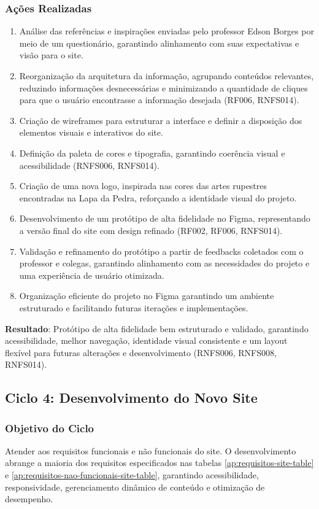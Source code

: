 \subsubsection*{Ações Realizadas}
\begin{enumerate}
    \item Análise das referências e inspirações enviadas pelo professor Edson Borges por meio de um questionário, garantindo alinhamento com suas expectativas e visão para o site.
    \item Reorganização da arquitetura da informação, agrupando conteúdos relevantes, reduzindo informações desnecessárias e minimizando a quantidade de cliques para que o usuário encontrasse a informação desejada (RF006, RNFS014).
    \item Criação de wireframes para estruturar a interface e definir a disposição dos elementos visuais e interativos do site.
    \item Definição da paleta de cores e tipografia, garantindo coerência visual e acessibilidade (RNFS006, RNFS014).
    \item Criação de uma nova logo, inspirada nas cores das artes rupestres encontradas na Lapa da Pedra, reforçando a identidade visual do projeto.
    \item Desenvolvimento de um protótipo de alta fidelidade no Figma, representando a versão final do site com design refinado (RF002, RF006, RNFS014).
    \item Validação e refinamento do protótipo a partir de feedbacks coletados com o professor e colegas, garantindo alinhamento com as necessidades do projeto e uma experiência de usuário otimizada.
    \item Organização eficiente do projeto no Figma garantindo um ambiente estruturado e facilitando futuras iterações e implementações.
\end{enumerate}

\textbf{Resultado}: Protótipo de alta fidelidade bem estruturado e validado, garantindo acessibilidade, melhor navegação, identidade visual consistente e um layout flexível para futuras alterações e desenvolvimento (RNFS006, RNFS008, RNFS014).
\subsection*{Ciclo 4: Desenvolvimento do Novo Site} \label{subsec:ciclo4}

\subsubsection*{Objetivo do Ciclo}
Atender aos requisitos funcionais e não funcionais do site. O desenvolvimento abrange a maioria dos requisitos especificados nas tabelas \ref{ap:requisitos-site-table} e \ref{ap:requisitos-nao-funcionais-site-table}, garantindo acessibilidade, responsividade, gerenciamento dinâmico de conteúdo e otimização de desempenho.

